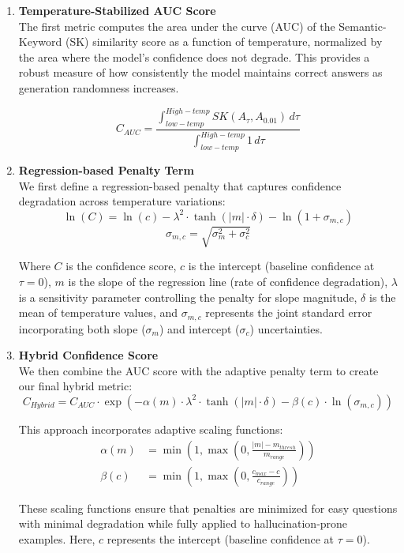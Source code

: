 \documentclass[sigconf]{acmart}
\begin{document}
\begin{enumerate}
    \item \textbf{Temperature-Stabilized AUC Score}\\
    The first metric computes the area under the curve (AUC) of the Semantic-Keyword (SK) similarity score as a function of temperature, normalized by the area where the model's confidence does not degrade. This provides a robust measure of how consistently the model maintains correct answers as generation randomness increases.

    \begin{equation}
        C_{AUC} = \frac{\int_{low-temp}^{High-temp} SK(A_\tau, A_{0.01}) \, d\tau}{\int_{low-temp}^{High-temp} 1 \, d\tau}
    \end{equation}
    
    \item \textbf{Regression-based Penalty Term}\\
    We first define a regression-based penalty that captures confidence degradation across temperature variations:
    \begin{equation}
        \ln(C) = \ln(c) - \lambda^2 \cdot \tanh(|m| \cdot \delta) - \ln(1 + \sigma_{m,c})
    \end{equation}
    \begin{equation}
        \sigma_{m,c} = \sqrt{\sigma^2_m + \sigma^2_c}
    \end{equation}
    
    Where $C$ is the confidence score, $c$ is the intercept (baseline confidence at $\tau=0$), $m$ is the slope of the regression line (rate of confidence degradation), $\lambda$ is a sensitivity parameter controlling the penalty for slope magnitude, $\delta$ is the mean of temperature values, and $\sigma_{m,c}$ represents the joint standard error incorporating both slope ($\sigma_m$) and intercept ($\sigma_c$) uncertainties.
    
    \item \textbf{Hybrid Confidence Score}\\
    We then combine the AUC score with the adaptive penalty term to create our final hybrid metric:
    \begin{equation}
        C_{Hybrid} = C_{AUC} \cdot \exp\left(-\alpha(m) \cdot \lambda^2 \cdot \tanh(|m| \cdot \delta) - \beta(c) \cdot \ln(\sigma_{m,c})\right)
    \end{equation}
    
    This approach incorporates adaptive scaling functions:
    \begin{align}
        \alpha(m) &= \min\left(1, \max\left(0, \frac{|m| - m_{thresh}}{m_{range}}\right)\right) \\
        \beta(c) &= \min\left(1, \max\left(0, \frac{c_{max} - c}{c_{range}}\right)\right)
    \end{align}
    
    These scaling functions ensure that penalties are minimized for easy questions with 
    minimal degradation while fully applied to hallucination-prone examples. Here, $c$ 
    represents the intercept (baseline confidence at $\tau=0$).
\end{enumerate}
\end{document}
